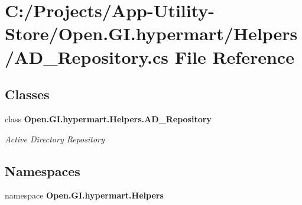 \section{C\+:/\+Projects/\+App-\/\+Utility-\/\+Store/\+Open.G\+I.\+hypermart/\+Helpers/\+A\+D\+\_\+\+Repository.cs File Reference}
\label{_a_d___repository_8cs}
\subsection*{Classes}
\begin{DoxyCompactItemize}
\item 
class \textbf{ Open.\+G\+I.\+hypermart.\+Helpers.\+A\+D\+\_\+\+Repository}
\begin{DoxyCompactList}\small\item\em Active Directory Repository \end{DoxyCompactList}\end{DoxyCompactItemize}
\subsection*{Namespaces}
\begin{DoxyCompactItemize}
\item 
namespace \textbf{ Open.\+G\+I.\+hypermart.\+Helpers}
\end{DoxyCompactItemize}

